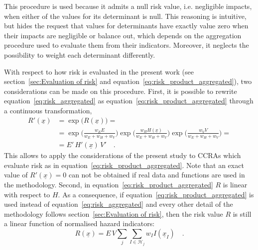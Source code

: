 This procedure is used because it admits a null \gls{risk} value, i.e. negligible \glspl{impact}, when either of the values for its \gls{determinant} is null. This reasoning is intuitive, but hides the request that values for \glspl{determinant} have exactly value zero when their \glspl{impact} are negligible or balance out, which depends on the aggregation procedure used to evaluate them from their \glspl{indicator}. Moreover, it neglects the possibility to weight each \gls{determinant} differently.

With respect to how \gls{risk} is evaluated in the present work (see section~\ref{sec:Evaluation of risk} and equation~\eqref{eq:risk_product_aggregated}), two considerations can be made on this procedure.
First, it is possible to rewrite equation~\eqref{eq:risk_aggregated} as equation~\eqref{eq:risk_product_aggregated} through a continuous transformation,
\begin{equation}
  \label{eq:risk_equivalence}
  \begin{split}
    R'(\underline{x}) & = \exp{\big( R(\underline{x}) \big)} = \\
    & = \exp{\bigg( \frac{w_E E}{w_E + w_H + w_V} \bigg)} \exp{\bigg( \frac{w_H H(\underline{x})}{w_E + w_H + w_V} \bigg)} \exp{\bigg( \frac{w_V V}{w_E + w_H + w_V} \bigg)} = \\
    & = E' \, H'(\underline{x}) \, V'
    \quad .
  \end{split}
\end{equation}
This allows to apply the considerations of the present study to \glspl{CCRA} which evaluate \gls{risk} as in equation~\eqref{eq:risk_product_aggregated}. Note that an exact value of $R'(\underline{x}) = 0$ can not be obtained if real data and functions are used in the methodology.
Second, in equation~\eqref{eq:risk_product_aggregated} $R$ is linear with respect to $H$. As a consequence, if equation~\eqref{eq:risk_product_aggregated} is used instead of equation~\eqref{eq:risk_aggregated} and every other detail of the methodology follows section~\ref{sec:Evaluation of risk}, then the \gls{risk} value $R$ is still a linear function of normalised \gls{hazard} \glspl{indicator}:
\begin{equation}
  \label{eq:risk_product_linearity}
  R(\underline{x}) = E \, V \sum_j \sum_{I \in \mathcal{H}_j} w_I I(\underline{x}_I)
  \quad .
\end{equation}

